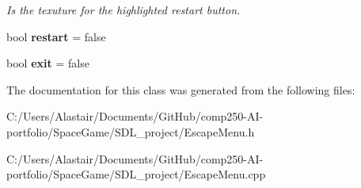 \begin{DoxyCompactItemize}
\begin{DoxyCompactList}\small\item\em Is the texuture for the highlighted restart button. \end{DoxyCompactList}\item 
\mbox{\label{class_escape_menu_ae7d75c060778703ea8a2d62cb786932f}} 
bool {\bfseries restart} = false
\item 
\mbox{\label{class_escape_menu_a7c518ab405d235a17014845a933259a1}} 
bool {\bfseries exit} = false
\end{DoxyCompactItemize}


The documentation for this class was generated from the following files\+:\begin{DoxyCompactItemize}
\item 
C\+:/\+Users/\+Alastair/\+Documents/\+Git\+Hub/comp250-\/\+A\+I-\/portfolio/\+Space\+Game/\+S\+D\+L\+\_\+project/Escape\+Menu.\+h\item 
C\+:/\+Users/\+Alastair/\+Documents/\+Git\+Hub/comp250-\/\+A\+I-\/portfolio/\+Space\+Game/\+S\+D\+L\+\_\+project/Escape\+Menu.\+cpp\end{DoxyCompactItemize}
